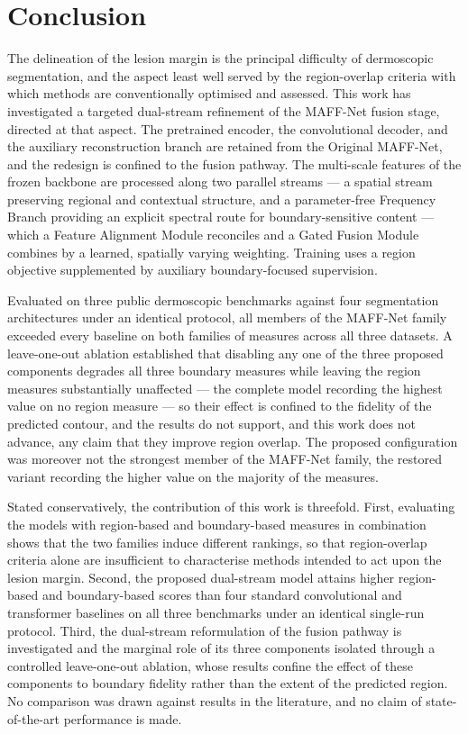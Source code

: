 \section{Conclusion}
\label{sec:conclusion}

The delineation of the lesion margin is the principal difficulty of dermoscopic segmentation, and the aspect least well served by the region-overlap criteria with which methods are conventionally optimised and assessed. This work has investigated a targeted dual-stream refinement of the MAFF-Net fusion stage, directed at that aspect. The pretrained encoder, the convolutional decoder, and the auxiliary reconstruction branch are retained from the Original MAFF-Net, and the redesign is confined to the fusion pathway. The multi-scale features of the frozen backbone are processed along two parallel streams --- a spatial stream preserving regional and contextual structure, and a parameter-free Frequency Branch providing an explicit spectral route for boundary-sensitive content --- which a Feature Alignment Module reconciles and a Gated Fusion Module combines by a learned, spatially varying weighting. Training uses a region objective supplemented by auxiliary boundary-focused supervision.

Evaluated on three public dermoscopic benchmarks against four segmentation architectures under an identical protocol, all members of the MAFF-Net family exceeded every baseline on both families of measures across all three datasets. A leave-one-out ablation established that disabling any one of the three proposed components degrades all three boundary measures while leaving the region measures substantially unaffected --- the complete model recording the highest value on no region measure --- so their effect is confined to the fidelity of the predicted contour, and the results do not support, and this work does not advance, any claim that they improve region overlap. The proposed configuration was moreover not the strongest member of the MAFF-Net family, the restored variant recording the higher value on the majority of the measures.

Stated conservatively, the contribution of this work is threefold. First, evaluating the models with region-based and boundary-based measures in combination shows that the two families induce different rankings, so that region-overlap criteria alone are insufficient to characterise methods intended to act upon the lesion margin. Second, the proposed dual-stream model attains higher region-based and boundary-based scores than four standard convolutional and transformer baselines on all three benchmarks under an identical single-run protocol. Third, the dual-stream reformulation of the fusion pathway is investigated and the marginal role of its three components isolated through a controlled leave-one-out ablation, whose results confine the effect of these components to boundary fidelity rather than the extent of the predicted region. No comparison was drawn against results in the literature, and no claim of state-of-the-art performance is made.

